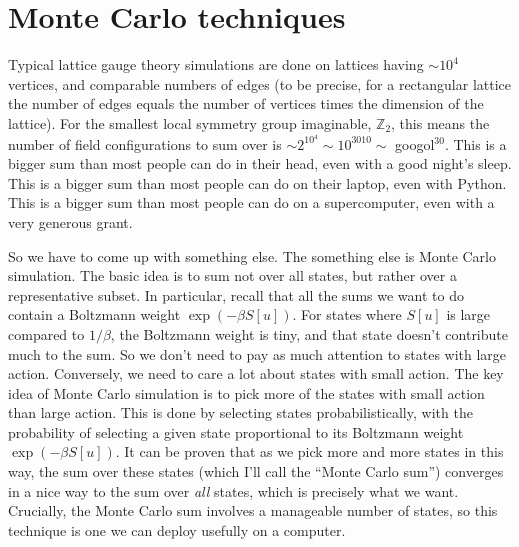 \documentclass[9pt,twocolumn,twoside]{article}
\begin{document}
\section{Monte Carlo techniques}
Typical lattice gauge theory simulations are done on lattices having $\sim 10^4$ vertices, and comparable numbers of edges (to be precise, for a rectangular lattice the number of edges equals the number of vertices times the dimension of the lattice).  For the smallest local symmetry group imaginable, $\mathbb{Z}_2$, this means the number of field configurations to sum over is $\sim 2^{10^4}\sim 10^{3010}\sim$ googol$^{30}$.  This is a bigger sum than most people can do in their head, even with a good night's sleep.  This is a bigger sum than most people can do on their laptop, even with Python.  This is a bigger sum than most people can do on a supercomputer, even with a very generous grant.  

So we have to come up with something else.  The something else is Monte Carlo simulation.  The basic idea is to sum not over all states, but rather over a representative subset.  In particular, recall that all the sums we want to do contain a Boltzmann weight $\exp(-\beta S[u])$.  For states where $S[u]$ is large compared to $1/\beta$, the Boltzmann weight is tiny, and that state doesn't contribute much to the sum.  So we don't need to pay as much attention to states with large action.  Conversely, we need to care a lot about states with small action.  The key idea of Monte Carlo simulation is to pick more of the states with small action than large action.  This is done by selecting states probabilistically, with the probability of selecting a given state proportional to its Boltzmann weight $\exp(-\beta S[u])$.  It can be proven that as we pick more and more states in this way, the sum over these states (which I'll call the ``Monte Carlo sum'') converges in a nice way to the sum over \textit{all} states, which is precisely what we want.  Crucially, the Monte Carlo sum involves a manageable number of states, so this technique is one we can deploy usefully on a computer. 
\end{document}
